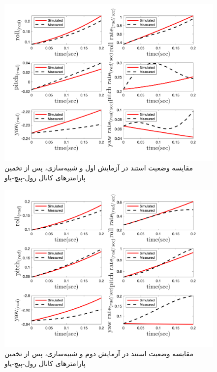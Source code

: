 \begin{figure}[H]
	\includegraphics[width=12cm]{../../Figures/RCP/roll_pitch_yaw_parameter_estimation/RCP_roll_pitch_yaw_S1.png}
	\centering
	\caption{مقايسه وضعیت استند در  آزمايش اول و شبیه‌سازی، پس از تخمین پارامترهای کانال رول-پیچ-یاو}
	\label{ roll_pitch_yaw_ps1}
\end{figure}
\begin{figure}[H]
	\includegraphics[width=12cm]{../../Figures/RCP/roll_pitch_yaw_parameter_estimation/RCP_roll_pitch_yaw_S2.png}
	\centering
	\caption{مقايسه وضعیت استند در  آزمايش دوم و شبیه‌سازی، پس از تخمین پارامترهای کانال رول-پیچ-یاو}
	\label{ roll_pitch_yaw_ps2}
\end{figure}
